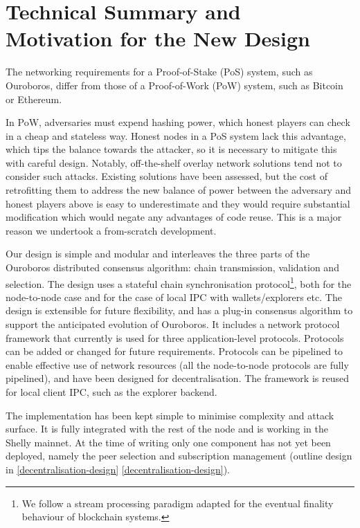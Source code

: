 \documentclass[11pt,a4paper]{article}
\begin{document}
\section{Technical Summary and Motivation for the New Design}
\label{technical-summary-and-motivation-for-the-new-design}

The networking requirements for a Proof-of-Stake (PoS) system, such as
Ouroboros, differ from those of a Proof-of-Work (PoW) system, such as
Bitcoin or Ethereum.

In PoW, adversaries must expend hashing power, which honest players can
check in a cheap and stateless way. Honest nodes in a PoS system lack
this advantage, which tips the balance towards the attacker, so it is
necessary to mitigate this with careful design. Notably, off-the-shelf
overlay network solutions tend not to consider such attacks. Existing
solutions have been assessed, but the cost of retrofitting them to
address the new balance of power between the adversary and honest
players above is easy to underestimate and they would require
substantial modification which would negate any advantages of code
reuse. This is a major reason we undertook a from-scratch development.

Our design is simple and modular and interleaves the three parts of the
Ouroboros distributed consensus algorithm: chain transmission,
validation and selection. The design uses a stateful chain
synchronisation protocol\footnote{We follow a stream processing paradigm
  adapted for the eventual finality behaviour of blockchain systems.},
both for the node-to-node case and for the case of local IPC with
wallets/explorers etc. The design is extensible for future flexibility,
and has a plug-in consensus algorithm to support the anticipated
evolution of Ouroboros. It includes a network protocol framework that
currently is used for three application-level protocols. Protocols can
be added or changed for future requirements. Protocols can be pipelined
to enable effective use of network resources (all the node-to-node
protocols are fully pipelined), and have been designed for
decentralisation. The framework is reused for local client IPC, such as
the explorer backend.

The implementation has been kept simple to minimise complexity and
attack surface. It is fully integrated with the rest of the node and is
working in the Shelly mainnet. At the time of writing only one component
has not yet been deployed, namely the peer selection and subscription
management (outline design in \cref{decentralisation-design}
\cref{decentralisation-design}).
\end{document}
